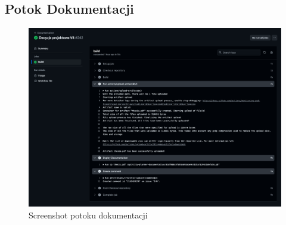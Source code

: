 \subsection{Potok Dokumentacji}
\label{subsec:potok-dokumentacji}

\begin{figure}[H]
    \centering
    \includegraphics[width=1\textwidth]{attachments/docs-ci}
    \caption{Screenshot potoku dokumentacji}
\end{figure}

